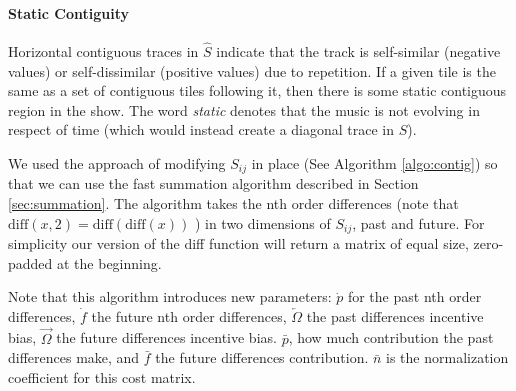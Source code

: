 \documentclass[twocolumn]{article}
\begin{document}
	
	
	
\paragraph{Static Contiguity}\label{sec:static-contiguity}

Horizontal contiguous traces in $\hat S$ indicate that the track is
self-similar (negative values) or self-dissimilar (positive values)
due to repetition. If a given tile is the same as a set of contiguous
tiles following it, then there is some static contiguous region in the
show. The word \textit{static} denotes that the music is not evolving in
respect of time (which would instead create a diagonal trace in $S$).

We used the approach of modifying $S_{ij}$ in place (See Algorithm \ref{algo:contig}) so that we can use the fast summation algorithm described in Section \ref{sec:summation}. The algorithm takes the nth order differences (note that $\mathrm{diff}(x,2) = \mathrm{diff}(\mathrm{diff}(x))$ ) in two dimensions of $S_{ij}$, past and future. For simplicity our version of the diff function will return a matrix of equal size, zero-padded at the beginning.

Note that this algorithm introduces new parameters: $\dot p$ for the past nth order differences, $\dot f$ the future nth order differences, $\overleftarrow{\Omega}$ the past differences incentive bias, $\overrightarrow{\Omega} $ the future differences incentive bias. $\bar p$, how much contribution the past differences make, and $\bar f$ the future differences contribution. $\bar n$ is the normalization coefficient for this cost matrix. 
\end{document}
